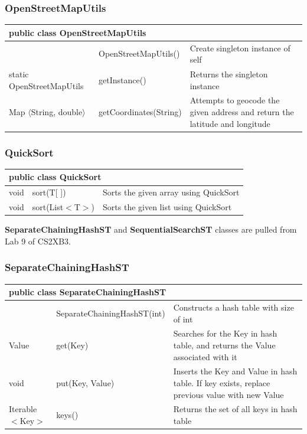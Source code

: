 \documentclass[12pt]{article}
\begin{document}
\subsubsection{OpenStreetMapUtils}
\begin{center}
\begin{tabular}{p{0.1\hsize}|p{0.25\hsize}|p{0.50\hsize}}
\multicolumn{3}{l}{\textbf{public class OpenStreetMapUtils}} \\
\hline
 & OpenStreetMapUtils() & Create singleton instance of self \\
\hline
static OpenStreetMapUtils & getInstance() & Returns the singleton instance \\
\hline
Map $\langle$String, double$\rangle$ & getCoordinates(String) & Attempts to geocode the given address and return the latitude and longitude \\
\hline
\end{tabular}
\end{center}

\bigskip
\subsubsection{QuickSort}
\begin{center}
\begin{tabular}{p{0.1\hsize}|p{0.25\hsize}|p{0.50\hsize}}
\multicolumn{3}{l}{\textbf{public class QuickSort}} \\
\hline
void & sort(T[ ]) & Sorts the given array using QuickSort \\
\hline
void & sort(List$<$T$>$) & Sorts the given list using QuickSort \\
\hline
\end{tabular}
\end{center}

\newpage
\noindent \textbf{SeparateChainingHashST} and \textbf{SequentialSearchST} classes are pulled from Lab 9 of CS2XB3.

\subsubsection{SeparateChainingHashST}
\begin{center}
\begin{tabular}{p{0.1\hsize}|p{0.35\hsize}|p{0.40\hsize}}
\multicolumn{3}{l}{\textbf{public class SeparateChainingHashST}} \\
\hline
& SeparateChainingHashST(int) & Constructs a hash table with size of int \\
\hline
Value & get(Key) & Searches for the Key in hash table, and returns the Value associated with it \\
\hline
void & put(Key, Value) & Inserts the Key and Value in hash table. If key exists, replace previous value with new Value \\
\hline
Iterable $<$Key$>$ & keys() & Returns the set of all keys in hash table \\
\hline
\end{tabular}
\end{center}
\end{document}

